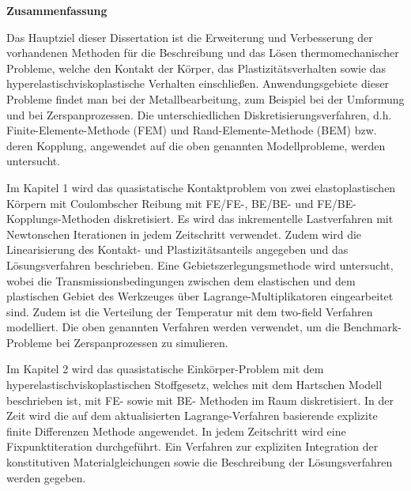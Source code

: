 
\vspace*{-25.0mm}



\begin{center}
\textsf{ \large
\textbf{Zusammenfassung}}
\end{center}
\vspace*{-3.0mm}
Das Hauptziel dieser Dissertation ist die Erweiterung und  Verbesserung der vorhandenen Methoden für die Beschreibung und das Lösen thermomechanischer Probleme, welche den  Kontakt der Körper, das Plastizitätsverhalten sowie das hyperelastischviskoplastische Verhalten  einschließen. Anwendungsgebiete dieser Probleme findet man bei  der Metallbearbeitung, zum Beispiel bei der Umformung  und bei Zerspanprozessen. Die unterschiedlichen Diskretisierungsverfahren, d.h. Finite-Elemente-Methode (FEM) und Rand-Elemente-Methode (BEM) bzw. deren Kopplung, angewendet  auf die oben genannten Modellprobleme, werden untersucht.

Im Kapitel 1 wird das quasistatische Kontaktproblem von zwei elastoplastischen Körpern  mit Coulombscher Reibung mit FE/FE-, BE/BE- und FE/BE- Kopplungs-Methoden diskretisiert. Es wird das inkrementelle Lastverfahren mit Newtonschen Iterationen in jedem Zeitschritt verwendet. Zudem wird die Linearisierung des Kontakt- und Plastizitätsanteils angegeben und das Lösungsverfahren beschrieben. Eine Gebietszerlegungsmethode wird untersucht, wobei die Transmissionsbedingungen zwischen dem elastischen und dem plastischen Gebiet des Werkzeuges über   Lagrange-Multiplikatoren eingearbeitet sind. Zudem ist  die Verteilung der Temperatur mit dem two-field Verfahren modelliert. Die oben genannten Verfahren werden verwendet, um die Benchmark-Probleme bei Zerspanprozessen zu simulieren.

Im Kapitel 2 wird das quasistatische Einkörper-Problem mit dem hyperelastischviskoplastischen Stoffgesetz,  welches mit  dem Hartschen Modell beschrieben ist,  mit FE- sowie mit BE- Methoden im Raum diskretisiert. In der Zeit wird die   auf dem aktualisierten Lagrange-Verfahren basierende explizite  finite Differenzen Methode  angewendet. In jedem Zeitschritt wird eine Fixpunktiteration durchgeführt. Ein  Verfahren zur expliziten Integration der konstitutiven  Materialgleichungen sowie die Beschreibung der Lösungsverfahren werden gegeben. 

